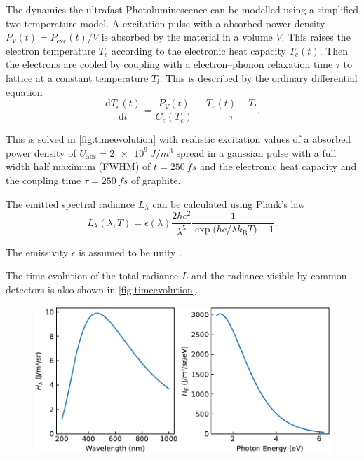 \documentclass[
	parskip=half,
	a4paper,
]{scrarticle}
\begin{document}
The dynamics the ultrafast Photoluminescence can be modelled using a simplified two temperature model. 
A excitation pulse with a absorbed power density $P_V(t) = P_\text{exc}(t) / V$ is absorbed by the material in a volume $V$.
This raises the electron temperature $T_e$ according to the electronic heat capacity $T_e(t)$. 
Then the electrons are cooled by coupling with a electron–phonon relaxation time $\tau$ to lattice at a constant temperature $T_l$.
This is described by the ordinary differential equation
\begin{equation}
    \frac{\mathrm d T_e(t)}{\mathrm d t}
    =
    \frac{P_V(t)}{C_e(T_e)}
    -\frac{T_e(t) - T_l}{\tau}.
    \label{eq:Te}
\end{equation}

This is solved in \autoref{fig:timeevolution} with realistic excitation values of a absorbed power density of $U_\text{abs} = \SI{2e9}{J/m^3}$ spread in a gaussian pulse with a full width half maximum (FWHM) of $t=\SI{250}{fs}$ and the electronic heat capacity \cite{nihiraTemperatureDependenceLattice2003} and the coupling time $\tau=\SI{250}{fs}$ \cite{stangeHotElectronCooling2015} of graphite.



The emitted spectral radiance $L_\lambda$ can be calculated using Plank's law
\begin{equation}
    L_\lambda(\lambda,T)
    = \epsilon(\lambda) \frac{2hc^{2}}{\lambda^{5}}
      \frac{1}{\exp\bigl(hc / \lambda k_{\mathrm B}T\bigr)-1}.
\end{equation}

The emissivity $\epsilon$ is assumed to be unity \cite{sapritskyBlackbodyRadiometry1995}.

The time evolution of the total radiance $L$ and the radiance visible by common detectors is also shown in \autoref{fig:timeevolution}.

\begin{figure}
    \centering
    \includegraphics{../analysis/figures/model.spectrum.pdf}
    \caption{}
    \label{fig:model_spectrum}
\end{figure}
\end{document}
